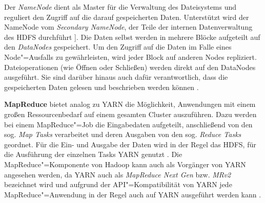 Der \emph{NameNode} dient als Master für die Verwaltung des Dateisystems und reguliert den Zugriff auf die darauf gespeicherten Daten.
Unterstützt wird der NameNode vom \emph{Secondary NameNode}, der Teile der internen Datenverwaltung des \ac{HDFS} durchführt \cite{HadoopHdfsGuide271}].
Die Daten selbst werden in mehrere Blöcke aufgeteilt auf den \emph{DataNodes} gespeichert.
Um den Zugriff auf die Daten im Falle eines Node"=Ausfalls zu gewährleisten, wird jeder Block auf anderen Nodes repliziert.
Dateioperationen (wie Öffnen oder Schließen) werden direkt auf den DataNodes ausgeführt.
Sie sind darüber hinaus auch dafür verantwortlich, dass die gespeicherten Daten gelesen und beschrieben werden können \cite{HadoopHdfsDesc271}.

\textbf{MapReduce} bietet analog zu YARN die Möglichkeit, Anwendungen mit einem großen Ressourcenbedarf auf einem gesamten Cluster auszuführen.
Dazu werden bei einem MapReduce"=Job die Eingabedaten aufgeteilt, anschließend von den sog. \emph{Map Tasks} verarbeitet und deren Ausgaben von den sog. \emph{Reduce Tasks} geordnet.
Für die Ein- und Ausgabe der Daten wird in der Regel das \acs{HDFS}, für die Ausführung der einzelnen Tasks YARN genutzt \cite{HadoopMapRedTutorial271}.
Die MapReduce"=Komponente von Hadoop kann auch als Vorgänger von YARN angesehen werden, da YARN auch als \emph{MapReduce Next Gen} bzw. \emph{MRv2} bezeichnet wird und aufgrund der API"=Kompatibilität von YARN jede MapReduce"=Anwendung in der Regel auch auf YARN ausgeführt werden kann \cite{HadoopYarnArch271,HadoopYarnOverview271}.
